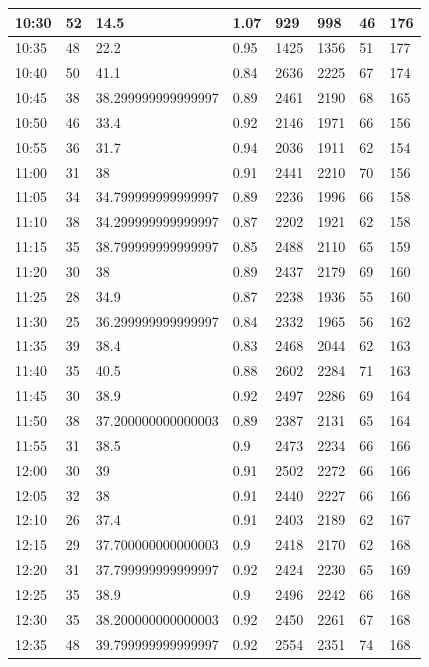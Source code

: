 \documentclass[
]{book}
\begin{document}
\begin{tabular}{l|l|l|l|l|l|l|l}
\hline
10:30 & 52 & 14.5 & 1.07 & 929 & 998 & 46 & 176\\
\hline
10:35 & 48 & 22.2 & 0.95 & 1425 & 1356 & 51 & 177\\
\hline
10:40 & 50 & 41.1 & 0.84 & 2636 & 2225 & 67 & 174\\
\hline
10:45 & 38 & 38.299999999999997 & 0.89 & 2461 & 2190 & 68 & 165\\
\hline
10:50 & 46 & 33.4 & 0.92 & 2146 & 1971 & 66 & 156\\
\hline
10:55 & 36 & 31.7 & 0.94 & 2036 & 1911 & 62 & 154\\
\hline
11:00 & 31 & 38 & 0.91 & 2441 & 2210 & 70 & 156\\
\hline
11:05 & 34 & 34.799999999999997 & 0.89 & 2236 & 1996 & 66 & 158\\
\hline
11:10 & 38 & 34.299999999999997 & 0.87 & 2202 & 1921 & 62 & 158\\
\hline
11:15 & 35 & 38.799999999999997 & 0.85 & 2488 & 2110 & 65 & 159\\
\hline
11:20 & 30 & 38 & 0.89 & 2437 & 2179 & 69 & 160\\
\hline
11:25 & 28 & 34.9 & 0.87 & 2238 & 1936 & 55 & 160\\
\hline
11:30 & 25 & 36.299999999999997 & 0.84 & 2332 & 1965 & 56 & 162\\
\hline
11:35 & 39 & 38.4 & 0.83 & 2468 & 2044 & 62 & 163\\
\hline
11:40 & 35 & 40.5 & 0.88 & 2602 & 2284 & 71 & 163\\
\hline
11:45 & 30 & 38.9 & 0.92 & 2497 & 2286 & 69 & 164\\
\hline
11:50 & 38 & 37.200000000000003 & 0.89 & 2387 & 2131 & 65 & 164\\
\hline
11:55 & 31 & 38.5 & 0.9 & 2473 & 2234 & 66 & 166\\
\hline
12:00 & 30 & 39 & 0.91 & 2502 & 2272 & 66 & 166\\
\hline
12:05 & 32 & 38 & 0.91 & 2440 & 2227 & 66 & 166\\
\hline
12:10 & 26 & 37.4 & 0.91 & 2403 & 2189 & 62 & 167\\
\hline
12:15 & 29 & 37.700000000000003 & 0.9 & 2418 & 2170 & 62 & 168\\
\hline
12:20 & 31 & 37.799999999999997 & 0.92 & 2424 & 2230 & 65 & 169\\
\hline
12:25 & 35 & 38.9 & 0.9 & 2496 & 2242 & 66 & 168\\
\hline
12:30 & 35 & 38.200000000000003 & 0.92 & 2450 & 2261 & 67 & 168\\
\hline
12:35 & 48 & 39.799999999999997 & 0.92 & 2554 & 2351 & 74 & 168\\

\end{tabular}
\end{document}

